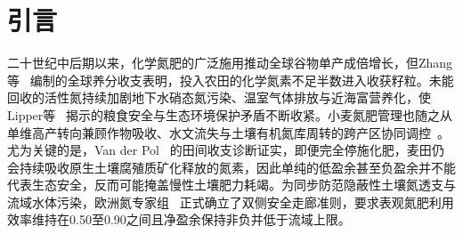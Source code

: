 \documentclass[11pt,a4paper]{article}
\begin{document}
\FloatBarrier

\section{引言}

二十世纪中后期以来，化学氮肥的广泛施用推动全球谷物单产成倍增长，但Zhang等~\citep{zhang2015} 编制的全球养分收支表明，投入农田的化学氮素不足半数进入收获籽粒。未能回收的活性氮持续加剧地下水硝态氮污染、温室气体排放与近海富营养化，使Lipper等~\citep{lipper2014} 揭示的粮食安全与生态环境保护矛盾不断收紧。小麦氮肥管理也随之从单维高产转向兼顾作物吸收、水文流失与土壤有机氮库周转的跨产区协同调控~\citep{chen2014}。尤为关键的是，Van der Pol~\citep{vanderpol1992} 的田间收支诊断证实，即便完全停施化肥，麦田仍会持续吸收原生土壤腐殖质矿化释放的氮素，因此单纯的低盈余甚至负盈余并不能代表生态安全，反而可能掩盖慢性土壤肥力耗竭。为同步防范隐蔽性土壤氮透支与流域水体污染，欧洲氮专家组~\citep{eunep2015} 正式确立了双侧安全走廊准则，要求表观氮肥利用效率维持在0.50至0.90之间且净盈余保持非负并低于流域上限。
\end{document}
